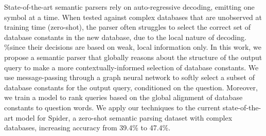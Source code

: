State-of-the-art semantic parsers rely on auto-regressive decoding, emitting one symbol at a time.
When tested against complex databases that are unobserved at training time (zero-shot), the parser often struggles to select the correct set of database constants in the new database, due to the local nature of decoding.
\%since their decisions are based on weak, local information only.
In this work, we propose a semantic parser that globally reasons about the structure of the output query to make a more contextually-informed 
selection of database constants. We use message-passing through a graph neural network to softly select a subset of database constants for the output query, conditioned on the question. Moreover, we train a model to rank queries based on the global alignment of database constants to question words.
We apply our techniques to the current state-of-the-art model for Spider, a zero-shot semantic parsing dataset with complex databases, increasing accuracy from 39.4\% to 47.4\%.